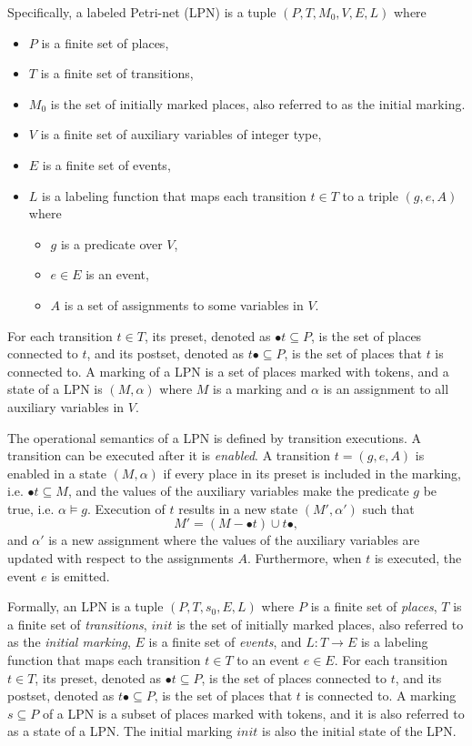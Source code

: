 \documentclass[12pt,frontmatter,copyright,thesis]{usfmanus}
\begin{document}
 Specifically, a labeled Petri-net (LPN) is a tuple $(P, T, M_0, V, E, L)$ where
 \begin{itemize}
 \item $P$ is a finite set of places,
 \item $T$ is a finite set of transitions,
 \item $M_0$ is the set of initially marked places, also referred to as the initial marking.
 \item $V$ is a finite set of auxiliary variables of integer type,
 \item $E$ is a finite set of events,
 \item $L$ is a labeling function that maps each transition $t \in T$ to a triple $(g, e, A)$ where
 	\begin{itemize}
 	\item $g$ is a predicate over $V$,
 	\item $e \in E$ is an event,
 	\item $A$ is a set of assignments to some variables in $V$.  
 	\end{itemize}
 \end{itemize}
 
 For each transition $t \in T$, its preset, denoted as $\bullet{t} \subseteq P$, is the set of places connected to $t$, and its postset, denoted as $t\bullet \subseteq P$, is the set of places that $t$ is connected to.  A marking of a LPN is a set of places marked with tokens, and a state of a LPN is $(M, \alpha)$ where $M$ is a marking and $\alpha$ is an assignment to all auxiliary variables in $V$.  
 
 The operational semantics of a LPN is defined by transition executions.  A transition can be executed after it is {\em enabled}.  A transition $t = (g, e, A)$ is enabled in a state $(M, \alpha)$ if every place in its preset is included in the marking, i.e. $\bullet{t} \subseteq M$, and the values of the auxiliary variables make the predicate $g$ be true, i.e. $\alpha \models g$.  Execution of $t$ results in a new state $(M', \alpha')$ such that 
 \[
 M' = (M - \bullet{t}) \cup t\bullet,
 \]
 and $\alpha'$ is a new assignment where the values of the auxiliary variables are updated with respect to the assignments $A$.  Furthermore, when $t$ is executed, the event $e$ is emitted.  


 Formally, an LPN is a tuple $(P, T, s_0, E, L)$ where $P$ is
 a finite set of {\em places}, $T$ is a finite set of {\em
   transitions}, $\mathit{init}$ is the set of initially
 marked places, also referred to as the {\em initial
   marking}, $E$ is a finite set of {\em events}, and $L: T
 \rightarrow E$ is a labeling function that maps each
 transition $t \in T$ to an event $e \in E$.  For each
 transition $t \in T$, its preset, denoted as $\bullet{t}
 \subseteq P$, is the set of places connected to $t$, and its
 postset, denoted as $t\bullet \subseteq P$, is the set of
 places that $t$ is connected to.  A marking $s \subseteq P$
 of a LPN is a subset of places marked with tokens, and it is
 also referred to as a state of a LPN.  The initial marking
 $\mathit{init}$ is also the initial state of the LPN.
\end{document}
